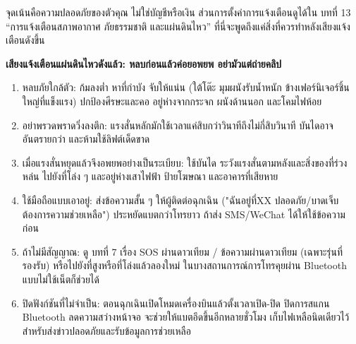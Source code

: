 


จุดเน้นคือความปลอดภัยของตัวคุณ ไม่ใช่บัญชีหรือเงิน ส่วนการตั้งค่าการแจ้งเตือนดูได้ใน บทที่ 13 “การแจ้งเตือนสภาพอากาศ ภัยธรรมชาติ และแผ่นดินไหว” ที่นี่จะพูดถึงแค่สิ่งที่ควรทำหลังเสียงแจ้งเตือนดังขึ้น

\textbf{เสียงแจ้งเตือนแผ่นดินไหวดังแล้ว: หลบก่อนแล้วค่อยอพยพ อย่ามัวแต่ถ่ายคลิป}\par

\begin{enumerate}
  \item หลบภัยใกล้ตัว: ก้มลงต่ำ หาที่กำบัง จับให้แน่น (ใต้โต๊ะ มุมผนังรับน้ำหนัก ข้างเฟอร์นิเจอร์ชิ้นใหญ่ที่แข็งแรง) ปกป้องศีรษะและคอ อยู่ห่างจากกระจก ผนังด้านนอก และโคมไฟห้อย
  \item อย่าพรวดพราดวิ่งลงตึก: แรงสั่นหลักมักใช้เวลาแค่สิบกว่าวินาทีถึงไม่กี่สิบวินาที บันไดอาจอันตรายกว่า และห้ามใช้ลิฟต์เด็ดขาด
  \item เมื่อแรงสั่นหยุดแล้วจึงอพยพอย่างเป็นระเบียบ: ใช้บันได ระวังแรงสั่นตามหลังและสิ่งของที่ร่วงหล่น ไปยังที่โล่ง ๆ และอยู่ห่างเสาไฟฟ้า ป้ายโฆษณา และอาคารที่เสียหาย
  \item ใช้มือถือแบบเอาอยู่: ส่งข้อความสั้น ๆ ให้ผู้ติดต่อฉุกเฉิน ("ฉันอยู่ที่XX ปลอดภัย/บาดเจ็บ ต้องการความช่วยเหลือ") ประหยัดแบตกว่าโทรยาว ถ้าส่ง SMS/WeChat ได้ให้ใช้ข้อความก่อน
  \item ถ้าไม่มีสัญญาณ: ดู บทที่ 7 เรื่อง SOS ผ่านดาวเทียม / ข้อความผ่านดาวเทียม (เฉพาะรุ่นที่รองรับ) หรือไปยังที่สูงหรือที่โล่งแล้วลองใหม่ ในบางสถานการณ์การโทรคุยผ่าน Bluetooth แบบไม่ใช้เน็ตก็ช่วยได้
  \item ปิดฟังก์ชันที่ไม่จำเป็น: ตอนฉุกเฉินเปิดโหมดเครื่องบินแล้วตั้งเวลาเปิด-ปิด ปิดการสแกน Bluetooth ลดความสว่างหน้าจอ จะช่วยให้แบตอึดขึ้นอีกหลายชั่วโมง เก็บไฟเหลือนิดเดียวไว้สำหรับส่งข่าวปลอดภัยและรับข้อมูลการช่วยเหลือ
\end{enumerate}

